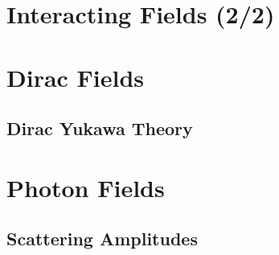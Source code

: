 \documentclass[12pt]{article}
\newcommand{\myqftsrcdirectory}[0]{myqft/src}
\newcommand{\mainqftsrcdirectory}[0]{src_qft}
\newcommand{\srcseventeen}[0]{myqft/versions/2017}
\begin{document}
\section{Interacting Fields (2/2)}
%

\label{sec:InteractingFields2}
%

\newpage
\section{Dirac Fields}
%
%


\subsection{Dirac Yukawa Theory}
\label{sec:DiracYukawa}




\begin{comment}
\subsection{Majorana Field}
Massless, spin1/2, selfconjugate.
\begin{equation}
i \slashed{\partial} \psi(x) = 0\,,
\hspace{3mm}
\bar{\psi}(x) i \stackrel{\leftarrow}{\slashed{\partial}}   = 0
\end{equation}
\end{comment}

\newpage
\section{Photon Fields}
%



\subsection{Scattering Amplitudes}

\end{document}

